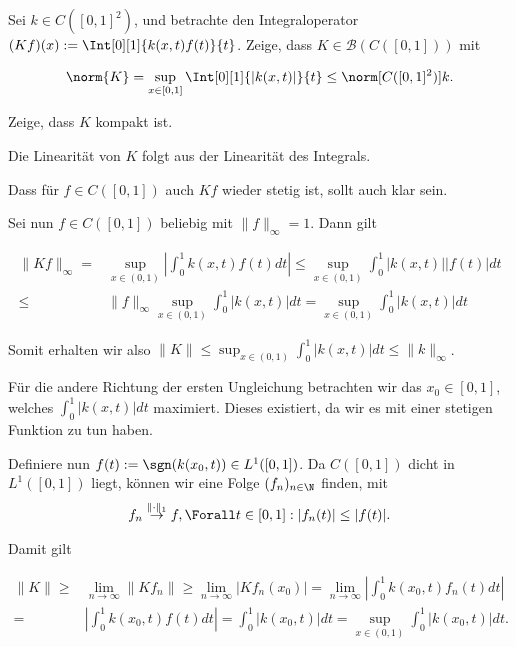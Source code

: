 \begin{exercise}[IO/4]

Sei $k \in C([0, 1]^2)$, und betrachte den Integraloperator $(K f)(x) := \Int[0][1]{k(x, t)f(t)}{t}$.
Zeige, dass $K \in \mathcal{B}(C([0, 1]))$ mit

\begin{align*}
  \norm{K}
  =
  \sup_{x \in [0, 1]} \Int[0][1]{|k(x, t)|}{t}
  \leq
  \norm[{C([0, 1]^2)}]{k}.
\end{align*}

Zeige, dass $K$ kompakt ist.

\end{exercise}

\begin{solution}

Die Linearität von $K$ folgt aus der Linearität des Integrals.

Dass für $f \in C([0,1])$ auch $Kf$ wieder stetig ist, sollt auch klar sein.

Sei nun $f \in C([0,1])$ beliebig mit $\|f\|_{\infty} = 1$. Dann gilt

\begin{align*}
  \|Kf\|_{\infty} =& \sup_{x \in (0,1)} | \int_{0}^{1} k(x,t)f(t)dt | \leq \sup_{x \in (0,1)} \int_{0}^{1} |k(x,t)||f(t)|dt \\
  \leq& \|f\|_{\infty} \sup_{x \in (0,1)} \int_{0}^{1} |k(x,t)|dt = \sup_{x \in (0,1)} \int_{0}^{1} |k(x,t)|dt
\end{align*}

Somit erhalten wir also $\|K\| \leq \sup_{x \in (0,1)} \int_{0}^{1} |k(x,t)|dt \leq \|k\|_{\infty}$.

Für die andere Richtung der ersten Ungleichung betrachten wir das $x_0 \in [0,1]$, welches $\int_{0}^{1} |k(x,t)|dt$ maximiert. Dieses existiert, da wir es mit einer stetigen Funktion zu tun haben.

Definiere nun $f(t) := \sgn(k(x_0,t)) \in L^1([0,1])$. Da $C([0,1])$ dicht in $L^1([0,1])$ liegt, können wir eine Folge $(f_n)_{n \in \N}$ finden, mit
\begin{align*}
  f_n \stackrel{\|\cdot\|_1}{\to} f, \Forall t \in [0,1]: |f_n(t)| \leq |f(t)|.
\end{align*}

Damit gilt

\begin{align*}
  \|K\| \geq& \lim_{n \to \infty} \|Kf_n\| \geq \lim_{n \to \infty} |Kf_n(x_0)| = \lim_{n \to \infty} |\int_{0}^{1} k(x_0,t)f_n(t) dt| \\
  =& |\int_{0}^{1} k(x_0,t)f(t) dt| = \int_{0}^{1} |k(x_0,t)| dt = \sup_{x \in (0,1)} \int_{0}^{1} |k(x_0,t)| dt.
\end{align*}


\end{solution}
